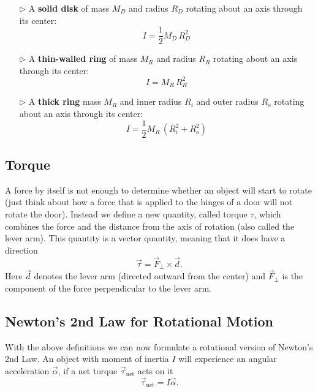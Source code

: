 \begin{itemize}
\item[$\triangleright$] A \textbf{solid disk} of mass $M_{D}$ and radius $R_{D}$ rotating about an axis through its center: 
  \begin{equation}
    \label{eq:M08Idisk}
    I= \frac{1}{2} M_{D} \, R_{D}^{2}
  \end{equation}
\item[$\triangleright$] A \textbf{thin-walled ring} of mass $M_{R}$ and radius $R_{R}$ rotating about an axis through its center: 
  \begin{equation}
    \label{eq:M08Ithinring}
    I= M_{R} \, R_{R}^{2}
  \end{equation}
\item[$\triangleright$] A \textbf{thick ring} mass $M_{R}$ and inner radius $R_{i}$ and outer radius $R_{o}$ rotating about an axis through its center:
  \begin{equation}
    \label{eq:M08Ithickring}
    I=\frac{1}{2} M_{R} \, \left(R_{i}^2 + R_{o}^2\right)
  \end{equation}
\end{itemize}

\subsection{Torque}

A force by itself is not enough to determine whether an object will start to rotate (just think about how a force that is applied to the hinges of a door will not rotate the door). Instead we define a new quantity, called torque $\tau$, which combines the force and the distance from the axis of rotation (also called the lever arm). This quantity is a vector quantity, meaning that it does have a direction
\begin{equation}
  \vec{\tau} = \vec{F}_{\perp} \times \vec{d}.
\end{equation}
Here $\vec{d}$ denotes the lever arm (directed outward from the center) and $\vec{F}_{\perp}$ is the component of the force perpendicular to the lever arm.

\subsection{Newton's 2nd Law for Rotational Motion}

With the above definitions we can now formulate a rotational version of Newton's 2nd Law. An object with moment of inertia $I$ will experience an angular acceleration $\vec{\alpha}$, if a net torque $\vec{\tau}_{\mbox{net}}$ acts on it
\begin{equation}
  \vec{\tau}_{\mbox{net}} = I \vec{\alpha}.
\end{equation}


